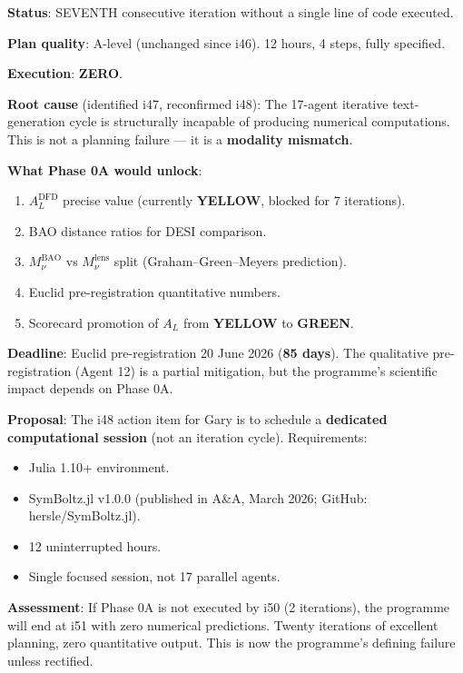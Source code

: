\documentclass[11pt,a4paper]{article}
\newcommand{\GREEN}{\textcolor{dfdgreen}{\textbf{GREEN}}}
\newcommand{\YELLOW}{\textcolor{dfdyellow}{\textbf{YELLOW}}}
\begin{document}
\begin{tcolorbox}[colback=red!5!white, colframe=red!60!black,
  title={CRITICAL: Phase 0A --- SEVENTH Iteration Without Execution --- Programme-Defining}]

\textbf{Status}: SEVENTH consecutive iteration without a single line of code executed.

\textbf{Plan quality}: A-level (unchanged since i46). 12 hours, 4 steps, fully specified.

\textbf{Execution}: \textbf{ZERO}.

\textbf{Root cause} (identified i47, reconfirmed i48): The 17-agent iterative text-generation cycle is structurally incapable of producing numerical computations. This is not a planning failure --- it is a \textbf{modality mismatch}.

\textbf{What Phase 0A would unlock}:
\begin{enumerate}
\item $A_L^{\text{DFD}}$ precise value (currently \YELLOW, blocked for 7 iterations).
\item BAO distance ratios for DESI comparison.
\item $M_\nu^{\text{BAO}}$ vs $M_\nu^{\text{lens}}$ split (Graham--Green--Meyers prediction).
\item Euclid pre-registration quantitative numbers.
\item Scorecard promotion of $A_L$ from \YELLOW{} to \GREEN.
\end{enumerate}

\textbf{Deadline}: Euclid pre-registration 20 June 2026 (\textbf{85 days}). The qualitative pre-registration (Agent 12) is a partial mitigation, but the programme's scientific impact depends on Phase 0A.

\textbf{Proposal}: The i48 action item for Gary is to schedule a \textbf{dedicated computational session} (not an iteration cycle). Requirements:
\begin{itemize}
\item Julia 1.10+ environment.
\item SymBoltz.jl v1.0.0 (published in A\&A, March 2026; GitHub: hersle/SymBoltz.jl).
\item 12 uninterrupted hours.
\item Single focused session, not 17 parallel agents.
\end{itemize}

\textbf{Assessment}: If Phase 0A is not executed by i50 (2 iterations), the programme will end at i51 with zero numerical predictions. Twenty iterations of excellent planning, zero quantitative output. This is now the programme's defining failure unless rectified.
\end{tcolorbox}
\end{document}
